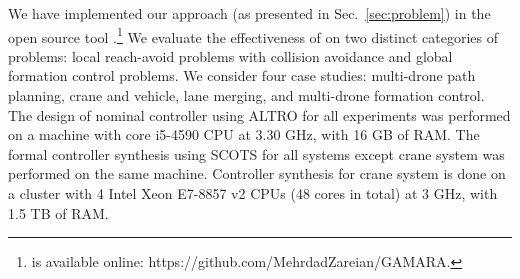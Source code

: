 We have implemented our approach (as presented in Sec.~\ref{sec:problem}) in the open source tool \tool.\footnote{
	\tool is available online: https://github.com/MehrdadZareian/GAMARA.
}
We evaluate the effectiveness of \tool on two distinct categories of problems: 
local reach-avoid problems with collision avoidance and global formation control problems. 
We consider four case studies: multi-drone path planning, crane and vehicle, lane merging, and multi-drone formation control. 
The design of nominal controller using ALTRO for all experiments was performed on a machine with core i5-4590 CPU at 3.30 GHz, with 16 GB of RAM.
The formal controller synthesis using SCOTS for all systems except crane system was performed on the same machine. Controller synthesis for crane system is done on a cluster with 4 Intel Xeon E7-8857 v2 CPUs (48 cores in total) at 3 GHz, with 1.5 TB of RAM. 

